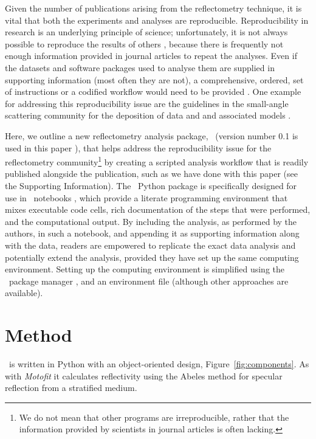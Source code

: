 \documentclass[pdf,preprint]{iucr}
\begin{document}
Given the number of publications arising from the reflectometry technique, it is vital that both the experiments and analyses are reproducible.
Reproducibility in research is an underlying principle of science; unfortunately, it is not always possible to reproduce the results of others \cite{Stark2018}, because there is frequently not enough information provided in journal articles to repeat the analyses. Even if the datasets and software packages used to analyse them are supplied in supporting information (most often they are not), a comprehensive, ordered, set of instructions or a codified workflow would need to be provided \cite{Moeller2017a}.
One example for addressing this reproducibility issue are the guidelines in the small-angle scattering community for the deposition of data and and associated models \cite{Trewhella:jc5010}.

Here, we outline a new reflectometry analysis package, \ (version number 0.1 is used in this paper \cite{refnx}), that helps address the reproducibility issue for the reflectometry community\footnote{We do not mean that other programs are irreproducible, rather that the information provided by scientists in journal articles is often lacking.} by creating a scripted analysis workflow that is readily published alongside the publication, such as we have done with this paper (see the Supporting Information).
The \ Python package is specifically designed for use in \Jupyter\ notebooks \cite{Kluyver:2016aa}, which provide a literate programming environment that mixes executable code cells, rich documentation of the steps that were performed, and the computational output. By including the analysis, as performed by the authors, in such a notebook, and appending it as supporting information along with the data, readers are empowered to replicate the exact data analysis and potentially extend the analysis, provided they have set up the same computing environment. Setting up the computing environment is simplified using the \conda\ package manager \cite{conda}, and an environment file (although other approaches are available).
\section{Method}

\ is written in Python with an object-oriented design, Figure~\ref{fig:components}. As with \emph{Motofit} \cite{Nelson2006} it calculates reflectivity using the Abeles method \cite{Heavens1955} for specular reflection from a stratified medium.
\end{document}
